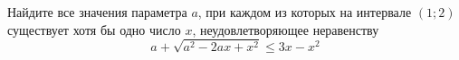 \begin{ex}
	\begin{condition}
		Найдите все значения параметра \( a \), при каждом из которых на интервале \( (1;2) \) существует хотя бы одно число \( x \), неудовлетворяющее неравенству \[ a+\sqrt{a^2-2ax+x^2}\le3x-x^2 \]
	\end{condition}
\end{ex}
